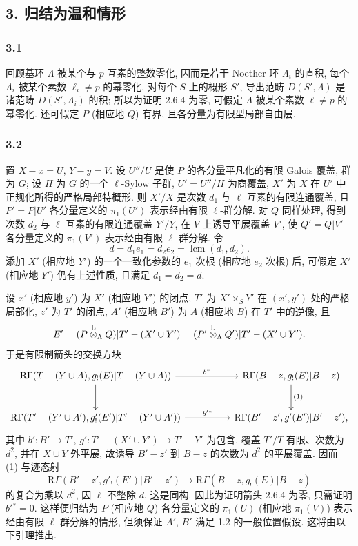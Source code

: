 \subsection*{3. 归结为温和情形}

\subsubsection*{3.1}
回顾基环 $\Lambda$ 被某个与 $p$ 互素的整数零化, 因而是若干 Noether 环 $\Lambda_i$ 的直积, 每个 $\Lambda_i$ 被某个素数 $\ell_i\ne p$ 的幂零化. 对每个 $S$ 上的概形 $S'$, 导出范畴 $D(S',\Lambda)$ 是诸范畴 $D(S',\Lambda_i)$ 的积; 所以为证明 2.6.4 为零, 可假定 $\Lambda$ 被某个素数 $\ell\ne p$ 的幂零化. 还可假定 $P$ (相应地 $Q$) 有界, 且各分量为有限型局部自由层.

\subsubsection*{3.2}
置 $X-x=U$, $Y-y=V$. 设 $U''/U$ 是使 $P$ 的各分量平凡化的有限 Galois 覆盖, 群为 $G$; 设 $H$ 为 $G$ 的一个 $\ell$-Sylow 子群, $U'=U''/H$ 为商覆盖, $X'$ 为 $X$ 在 $U'$ 中正规化所得的严格局部特概形. 则 $X'/X$ 是次数 $d_1$ 与 $\ell$ 互素的有限连通覆盖, 且 $P'=P|U'$ 各分量定义的 $\pi_1(U')$ 表示经由有限 $\ell$-群分解. 对 $Q$ 同样处理, 得到次数 $d_2$ 与 $\ell$ 互素的有限连通覆盖 $Y'/Y$, 在 $V$ 上诱导平展覆盖 $V'$, 使 $Q'=Q|V'$ 各分量定义的 $\pi_1(V')$ 表示经由有限 $\ell$-群分解. 令
\[
d=d_1e_1=d_2e_2=\operatorname{lcm}(d_1,d_2).
\]
添加 $X'$ (相应地 $Y'$) 的一个一致化参数的 $e_1$ 次根 (相应地 $e_2$ 次根) 后, 可假定 $X'$ (相应地 $Y'$) 仍有上述性质, 且满足 $d_1=d_2=d$.

设 $x'$ (相应地 $y'$) 为 $X'$ (相应地 $Y'$) 的闭点, $T'$ 为 $X'\times_S Y'$ 在 $(x',y')$ 处的严格局部化, $z'$ 为 $T'$ 的闭点, $A'$ (相应地 $B'$) 为 $A$ (相应地 $B$) 在 $T'$ 中的逆像, 且
\[
E'=(P\overset{\mathrm L}{\otimes}_{\Lambda}Q)|T'-(X'\cup Y')
   =(P'\overset{\mathrm L}{\otimes}_{\Lambda}Q')|T'-(X'\cup Y').
\]
于是有限制箭头的交换方块
\[
\begin{tikzcd}[column sep=huge,row sep=large]
\mathrm R\Gamma(T-(Y\cup A),g_!(E)|T-(Y\cup A))
 \arrow[r,"b^*"] \arrow[d]
&
\mathrm R\Gamma(B-z,g_!(E)|B-z) \arrow[d,"(1)"]\\
\mathrm R\Gamma(T'-(Y'\cup A'),g'_!(E')|T'-(Y'\cup A'))
 \arrow[r,"b'{}^*"]
&
\mathrm R\Gamma(B'-z',g'_!(E')|B'-z') ,
\end{tikzcd}
\]
其中 $b':B'\to T'$, $g':T'-(X'\cup Y')\to T'-Y'$ 为包含. 覆盖 $T'/T$ 有限、次数为 $d^2$, 并在 $X\cup Y$ 外平展, 故诱导 $B'-z'$ 到 $B-z$ 的次数为 $d^2$ 的平展覆盖. 因而 (1) 与迹态射
\[
\mathrm R\Gamma(B'-z',g'_!(E')|B'-z')
 \longrightarrow
\mathrm R\Gamma(B-z,g_!(E)|B-z)
\]
的复合为乘以 $d^2$, 因 $\ell$ 不整除 $d$, 这是同构. 因此为证明箭头 2.6.4 为零, 只需证明 $b'{}^*=0$. 这样便归结为 $P$ (相应地 $Q$) 各分量定义的 $\pi_1(U)$ (相应地 $\pi_1(V)$) 表示经由有限 $\ell$-群分解的情形, 但须保证 $A'$, $B'$ 满足 1.2 的一般位置假设. 这将由以下引理推出.

